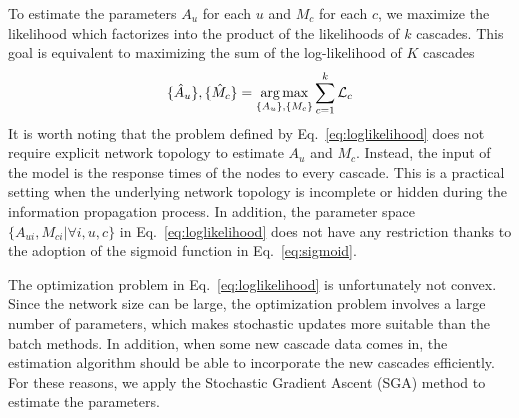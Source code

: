 To estimate the parameters $A_u$ for each $u$ and $M_c$ for each $c$, we maximize the likelihood which factorizes into the product of the likelihoods of $k$ cascades. This goal is equivalent to maximizing the sum of the log-likelihood of $K$ cascades
\begin{equation} \label{eq:loglikelihood}
\{\hat{A}_u\}, \{\hat{M}_c\} = \operatorname*{arg\,max}_{\{A_u\}, \{M_c\}} \sum_{c=1}^{k} \mathcal{L}_c
\end{equation}
It is worth noting that the problem defined by Eq.~\ref{eq:loglikelihood} does not require explicit network topology to estimate $A_u$ and $M_c$. Instead, the input of the model is the response times of the nodes to every cascade. This is a practical setting when the underlying network topology is incomplete or hidden during the information propagation process. In addition, the parameter space $\{A_{ui},M_{ci}|\forall i,u,c\}$ in Eq.~\ref{eq:loglikelihood} does not have any restriction thanks to the adoption of the sigmoid function in Eq.~\ref{eq:sigmoid}.

The optimization problem in Eq.~\ref{eq:loglikelihood} is unfortunately not convex. Since the network size can be large, the optimization problem involves a large number of parameters, which makes stochastic updates more suitable than the batch methods. In addition, when some new cascade data comes in, the estimation algorithm should be able to incorporate the new cascades efficiently. For these reasons, we apply the Stochastic Gradient Ascent (SGA) method to estimate the parameters.

